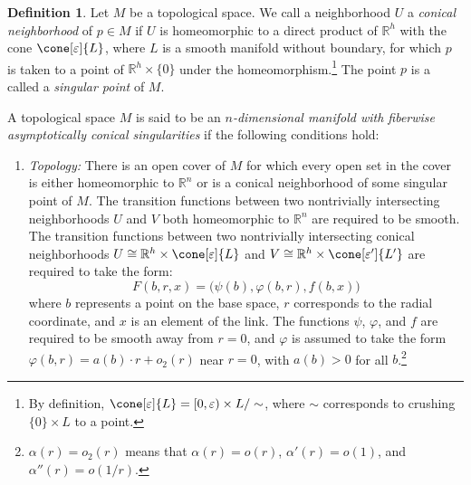 \documentclass[12pt, reqno]{amsart}
\theoremstyle{plain} %
\theoremstyle{definition}
\newtheorem{definition}[theorem]{Definition}
\theoremstyle{remark}
\numberwithin{equation}{section}
\newcommand{\field}[1]{\mathbb{#1}}
\newcommand{\R}{\field{R}}
\newcommand{\hdim}{h} %
\newcommand{\tdim}{n} %
\begin{document}
\begin{definition}\label{def:FACS manifolds}
    Let \(M\) be a topological space.
    We call a neighborhood \(U\) a \textit{conical neighborhood} of \(p \in M\) if \(U\) is homeomorphic to a direct product of \(\R^\hdim\) with the cone \(\cone[\varepsilon]{L}\), where \(L\) is a smooth manifold without boundary, for which \(p\) is taken to a point of \(\R^\hdim \times \{0\}\) under the homeomorphism.\footnote{By definition, \(\cone[\varepsilon]{L} = [0, \varepsilon) \times L / \sim\), where \(\sim\) corresponds to crushing \(\{0\} \times L\) to a point.}
    The point \(p\) is a called a \textit{singular point} of \(M\).

    A topological space \(M\) is said to be an \textit{\(\tdim\)-dimensional manifold with fiberwise asymptotically conical singularities} if the following conditions hold:
    \begin{enumerate}[label=(\alph*)]
        \item \emph{Topology:} There is an open cover of \(M\) for which every open set in the cover is either homeomorphic to \(\R^\tdim\) or is a conical neighborhood of some singular point of \(M\).
        The transition functions between two nontrivially intersecting neighborhoods \(U\) and \(V\) both homeomorphic to \(\R^\tdim\) are required to be smooth.
        The transition functions between two nontrivially intersecting conical neighborhoods \(U \cong \R^\hdim \times \cone[\varepsilon]{L}\) and \(V \cong \R^\hdim \times \cone[\varepsilon']{L'}\) are required to take the form:
        \begin{equation*}
            F(b,r,x) = \big(\psi(b), \varphi(b,r), f(b,x)\big)
        \end{equation*}
        where \(b\) represents a point on the base space, \(r\) corresponds to the radial coordinate, and \(x\) is an element of the link.
        The functions \(\psi\), \(\varphi\), and \(f\) are required to be smooth away from \(r=0\), and \(\varphi\) is assumed to take the form \(\varphi(b,r) = a(b) \cdot r + o_2(r)\) near \(r=0\), with \(a(b) > 0\) for all \(b\).\footnote{\(\alpha(r) = o_2(r)\) means that \(\alpha(r) = o(r)\), \(\alpha'(r) = o(1)\), and \(\alpha''(r) = o(1/r)\).}


\end{enumerate}
\end{definition}
\end{document}
